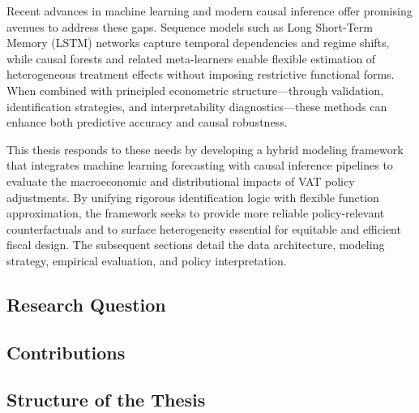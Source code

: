Recent advances in machine learning and modern causal inference offer promising avenues to address these gaps. Sequence models such as Long Short-Term Memory (LSTM) networks capture temporal dependencies and regime shifts, while causal forests and related meta-learners enable flexible estimation of heterogeneous treatment effects without imposing restrictive functional forms. When combined with principled econometric structure—through validation, identification strategies, and interpretability diagnostics—these methods can enhance both predictive accuracy and causal robustness.

This thesis responds to these needs by developing a hybrid modeling framework that integrates machine learning forecasting with causal inference pipelines to evaluate the macroeconomic and distributional impacts of VAT policy adjustments. By unifying rigorous identification logic with flexible function approximation, the framework seeks to provide more reliable policy-relevant counterfactuals and to surface heterogeneity essential for equitable and efficient fiscal design. The subsequent sections detail the data architecture, modeling strategy, empirical evaluation, and policy interpretation.


\subsection{Research Question}

\subsection{Contributions}

\subsection{Structure of the Thesis}
